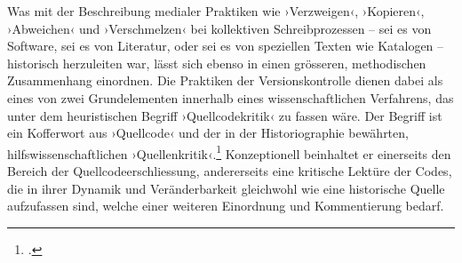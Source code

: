 \documentclass[a4paper,11pt]{article}
\newcommand{\inanf}[1]{›#1‹}
\begin{document}


Was mit der Beschreibung medialer Praktiken wie \inanf{Verzweigen}, \inanf{Kopieren}, \inanf{Abweichen} und \inanf{Verschmelzen} bei kollektiven Schreibprozessen – sei es von Software, sei es von Literatur, oder sei es von speziellen Texten wie Katalogen – historisch herzuleiten war, lässt sich ebenso in einen grösseren, methodischen Zusammenhang einordnen. Die Praktiken der Versionskontrolle dienen dabei als eines von zwei Grundelementen innerhalb eines wissenschaftlichen Verfahrens, das unter dem heuristischen Begriff \inanf{Quellcodekritik} zu fassen wäre. Der Begriff ist ein Kofferwort aus \inanf{Quellcode} und der in der Historiographie bewährten, hilfswissenschaftlichen \inanf{Quellenkritik}.\footcites[Vgl. dazu z.B.][376 ff.]{saxer:2014}[oder][]{brasi:2004} Konzeptionell beinhaltet er einerseits den Bereich der Quellcodeerschliessung, andererseits eine kritische Lektüre der Codes, die in ihrer Dynamik und Veränderbarkeit gleichwohl wie eine historische Quelle aufzufassen sind, welche einer weiteren Einordnung und Kommentierung bedarf.  
\end{document}
